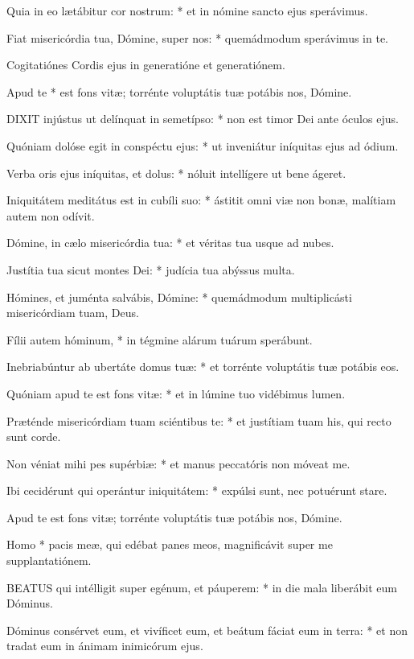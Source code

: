 Quia in eo lætábitur cor nostrum: * et in nómine sancto ejus sperávimus.

Fiat misericórdia tua, Dómine, super nos: * quemádmodum sperávimus in te.

 Cogitatiónes Cordis ejus in generatióne et generatiónem.

 Apud te * est fons vitæ; torrénte voluptátis tuæ potábis nos, Dómine.


\lettrine[lines=2]{D}{IXIT} injústus ut delínquat in semetípso: * non est timor Dei ante óculos ejus.

Quóniam dolóse egit in conspéctu ejus: * ut inveniátur iníquitas ejus ad ódium.

Verba oris ejus iníquitas, et dolus: * nóluit intellígere ut bene ágeret.

Iniquitátem meditátus est in cubíli suo: * ástitit omni viæ non bonæ, malítiam autem non odívit.

Dómine, in cælo misericórdia tua: * et véritas tua usque ad nubes.

Justítia tua sicut montes Dei: * judícia tua abýssus multa.

Hómines, et juménta salvábis, Dómine: * quemádmodum multiplicásti misericórdiam tuam, Deus.

Fílii autem hóminum, * in tégmine alárum tuárum sperábunt.

Inebriabúntur ab ubertáte domus tuæ: * et torrénte voluptátis tuæ potábis eos.

Quóniam apud te est fons vitæ: * et in lúmine tuo vidébimus lumen.

Præténde misericórdiam tuam sciéntibus te: * et justítiam tuam his, qui recto sunt corde.

Non véniat mihi pes supérbiæ: * et manus peccatóris non móveat me.

Ibi cecidérunt qui operántur iniquitátem: * expúlsi sunt, nec potuérunt stare.

 Apud te est fons vitæ; torrénte voluptátis tuæ potábis nos, Dómine.

 Homo * pacis meæ, qui edébat panes meos, magnificávit super me supplantatiónem.


\lettrine[lines=2]{B}{EATUS} qui intélligit super egénum, et páuperem: * in die mala liberábit eum Dóminus.

Dóminus consérvet eum, et vivíficet eum, et beátum fáciat eum in terra: * et non tradat eum in ánimam inimicórum ejus.

